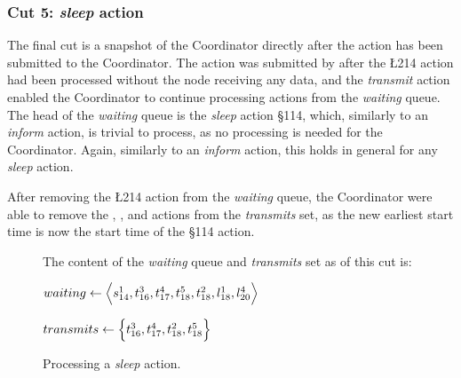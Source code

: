 \subsubsection{Cut 5: \textit{sleep} action}
The final cut is a snapshot of the Coordinator directly after the  action has been submitted to the
Coordinator. The  action was submitted by  after the \L{2}{14} action had been processed
without the node receiving any data, and the \textit{transmit} action enabled the Coordinator to continue
processing actions from the \textit{waiting} queue. The head of the \textit{waiting} queue is the
\textit{sleep} action \S{1}{14}, which, similarly to an \textit{inform} action, is trivial to process, as no
processing is needed for the Coordinator. Again, similarly to an \textit{inform} action, this holds in general
for any \textit{sleep} action. \smallbreak

After removing the \L{2}{14} action from the \textit{waiting} queue, the Coordinator were able to remove the
, , and  actions from the \textit{transmits} set, as the new earliest start time is
now the start time of the \S{1}{14} action.

\begin{figure}[H]
    \caption{Processing a \textit{sleep} action.}\label{tikz:coordinatormsc5}
     \par

    \begin{minipage}[h]{14.5cm}
        The content of the \textit{waiting} queue and \textit{transmits} set as of this cut is: \smallbreak

        $waiting \leftarrow \Big\langle s^{1}_{14}, t^{3}_{16}, t^{4}_{17}, t^{5}_{18}, t^{2}_{18}, l^{1}_{18},
            l^{4}_{20} \Big\rangle$

        $transmits \leftarrow \Big\{ t^{3}_{16}, t^{4}_{17}, t^{2}_{18}, t^{5}_{18} \Big\}$
    \end{minipage}
\end{figure}